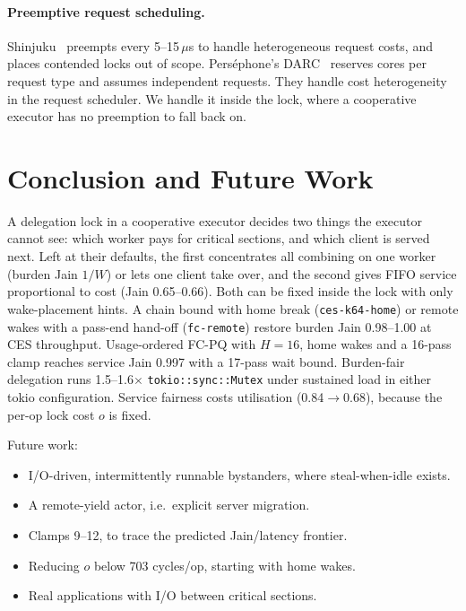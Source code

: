 \documentclass[10pt,twocolumn]{article}
\newcommand{\lk}[1]{\texttt{#1}}
\begin{document}
\paragraph{Preemptive request scheduling.} Shinjuku~\cite{shinjuku} preempts
every 5--15\,$\mu$s to handle heterogeneous request costs, and places contended
locks out of scope. Perséphone's DARC~\cite{persephone} reserves cores per
request type and assumes independent requests. They handle cost heterogeneity
in the request scheduler. We handle it inside the lock, where a cooperative
executor has no preemption to fall back on.

\section{Conclusion and Future Work}\label{sec:concl}

A delegation lock in a cooperative executor decides two things the executor
cannot see: which worker pays for critical sections, and which client is
served next. Left at their defaults, the first concentrates all combining on
one worker (burden Jain $1/W$) or lets one client take over, and the second
gives FIFO service proportional to cost (Jain 0.65--0.66). Both can be fixed
inside the lock with only wake-placement hints. A chain bound with home break
(\lk{ces-k64-home}) or remote wakes with a pass-end hand-off (\lk{fc-remote})
restore burden Jain 0.98--1.00 at CES throughput. Usage-ordered FC-PQ with
$H{=}16$, home wakes and a 16-pass clamp reaches service Jain 0.997 with a
17-pass wait bound. Burden-fair delegation runs 1.5--1.6$\times$
\lk{tokio::sync::Mutex} under sustained load in either tokio configuration.
Service fairness costs utilisation (0.84$\to$0.68), because the per-op lock
cost $o$ is fixed.

Future work:
\begin{itemize}
\item I/O-driven, intermittently runnable bystanders, where steal-when-idle
  exists.
\item A remote-yield actor, i.e.\ explicit server migration.
\item Clamps 9--12, to trace the predicted Jain/latency frontier.
\item Reducing $o$ below 703 cycles/op, starting with home wakes.
\item Real applications with I/O between critical sections.
\end{itemize}

{\small
}
\end{document}
